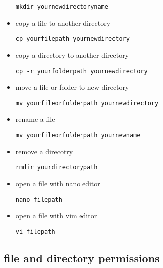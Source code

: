 \documentclass[
]{article}
\begin{document}
\begin{itemize}
\begin{verbatim}
mkdir yournewdirectoryname
\end{verbatim}
\item
  copy a file to another directory

\begin{verbatim}
cp yourfilepath yournewdirectory
\end{verbatim}
\item
  copy a directory to another directory

\begin{verbatim}
cp -r yourfolderpath yournewdirectory
\end{verbatim}
\item
  move a file or folder to new directory

\begin{verbatim}
mv yourfileorfolderpath yournewdirectory
\end{verbatim}
\item
  rename a file

\begin{verbatim}
mv yourfileorfolderpath yournewname
\end{verbatim}
\item
  remove a direcotry

\begin{verbatim}
rmdir yourdirectorypath
\end{verbatim}
\item
  open a file with nano editor

\begin{verbatim}
nano filepath
\end{verbatim}
\item
  open a file with vim editor

\begin{verbatim}
vi filepath
\end{verbatim}
\end{itemize}

\hypertarget{file-and-directory-permissions}{%
\subsection{file and directory
permissions}\label{file-and-directory-permissions}}
\end{document}
